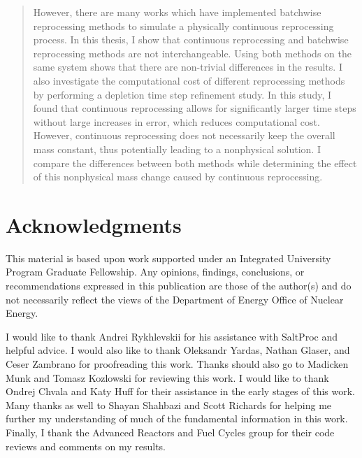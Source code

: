 \documentclass[edeposit,fullpage,hidelinks]{uiucthesis2018}
\begin{document}
\begin{abstract}
However, there are many works which have implemented batchwise reprocessing methods to simulate a physically continuous reprocessing process.
In this thesis, I show that continuous reprocessing and batchwise reprocessing methods are not interchangeable.
Using both methods on the same system shows that there are non-trivial differences in the results.
I also investigate the computational cost of different reprocessing methods by performing a depletion time step refinement study.
In this study, I found that continuous reprocessing allows for significantly larger time steps without large increases in error, which reduces computational cost.
However, continuous reprocessing does not necessarily keep the overall mass constant, thus potentially leading to a nonphysical solution.
I compare the differences between both methods while determining the effect of this nonphysical mass change caused by continuous reprocessing.


\end{abstract}

\chapter*{Acknowledgments}

This material is based upon work supported under an Integrated University Program Graduate Fellowship.
Any opinions, findings, conclusions, or recommendations expressed in this publication are
those of the author(s) and do not necessarily reflect the views of the Department of Energy
Office of Nuclear Energy.

I would like to thank Andrei Rykhlevskii for his assistance with SaltProc and helpful advice.
I would also like to thank Oleksandr Yardas, Nathan Glaser, and Ceser Zambrano for proofreading this work.
Thanks should also go to Madicken Munk and Tomasz Kozlowski for reviewing this work.
I would like to thank Ondrej Chvala and Katy Huff for their assistance in the early stages of this work.
Many thanks as well to Shayan Shahbazi and Scott Richards for helping me further my understanding of much of the fundamental information in this work.
Finally, I thank the Advanced Reactors and Fuel Cycles group for their code reviews and comments on my results.
\end{document}
